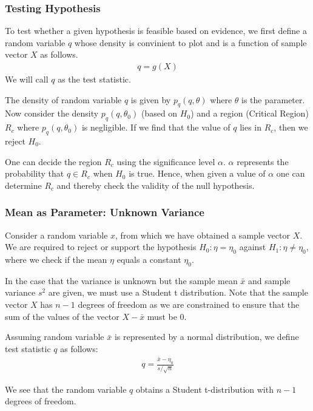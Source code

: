 \documentclass{beamer}
\begin{document}
\begin{frame}
	\frametitle{Testing Hypothesis}
	To test whether a given hypothesis is feasible based on evidence, we first define a random variable $q$ whose density is convinient to plot and is a function of sample vector $X$ as follows.
	\begin{align}
		q = g(X)
		\label{eq:TestStat}
	\end{align}
	We will call $q$ as the test statistic.

	The density of random variable $q$ is given by $p_q(q, \theta)$ where $\theta$ is the parameter. Now consider the density $p_q(q, \theta_0)$ (based on $H_0$) and a region (Critical Region) $R_c$ where $p_q(q, \theta_0)$ is negligible. If we find that the value of $q$ lies in $R_c$, then we reject $H_0$.

	One can decide the region $R_c$ using the significance level $\alpha$. $\alpha$ represents the probability that $q \in R_c$ when $H_0$ is true. Hence, when given a value of $\alpha$ one can determine $R_c$ and thereby check the validity of the null hypothesis. 
\end{frame}

\begin{frame}
	\frametitle{Mean as Parameter: Unknown Variance}
	Consider a random variable $x$, from which we have obtained a sample vector $X$. We are required to reject or support the hypothesis $H_0: \eta = \eta_0$ against $H_1: \eta \neq \eta_0$, where we check if the mean $\eta$ equals a constant $\eta_0$.

	In the case that the variance is unknown but the sample mean $\bar{x}$ and sample variance $s^2$ are given, we must use a Student t distribution. Note that the sample vector $X$ has $n - 1$ degrees of freedom as we are constrained to ensure that the sum of the values of the vector $X - \bar{x}$ must be 0.

	Assuming random variable $\bar{x}$ is represented by a normal distribution, we define test statistic $q$ as follows:
	\begin{align}
		q = \frac{\bar{x} - \eta_0}{s/\sqrt{n}}
		\label{eq:UnknownVar}
	\end{align}
	
	We see that the random variable $q$ obtains a Student t-distribution with $n - 1$ degrees of freedom.
\end{frame}
\end{document}
